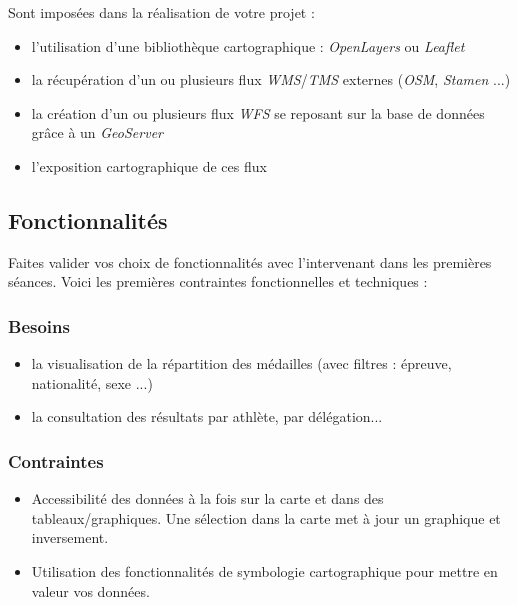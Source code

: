 \documentclass{article}
\begin{document}
Sont imposées dans la réalisation de votre projet :

\begin{itemize}

\item l'utilisation d'une bibliothèque cartographique : \textit{OpenLayers} ou \textit{Leaflet}

\item la récupération d'un ou plusieurs flux \textit{WMS}/\textit{TMS} externes (\textit{OSM}, \textit{Stamen} ...)

\item la création d'un ou plusieurs flux \textit{WFS} se reposant sur la base de données grâce à un \textit{GeoServer}

\item l'exposition cartographique de ces flux

\end{itemize}

\newpage

\subsection{Fonctionnalités}

Faites valider vos choix de fonctionnalités avec l'intervenant dans les premières séances.
Voici les premières contraintes fonctionnelles et techniques :

\subsubsection{Besoins}

\begin{itemize}

\item la visualisation de la répartition des médailles (avec filtres : épreuve, nationalité, sexe ...)

\item la consultation des résultats par athlète, par délégation...

\end{itemize}

\subsubsection{Contraintes}

\begin{itemize}

\item Accessibilité des données à la fois sur la carte et dans des tableaux/graphiques. Une sélection dans la carte met à jour un graphique et inversement.

\item Utilisation des fonctionnalités de symbologie cartographique pour mettre en valeur vos données.

\end{itemize}
\end{document}
